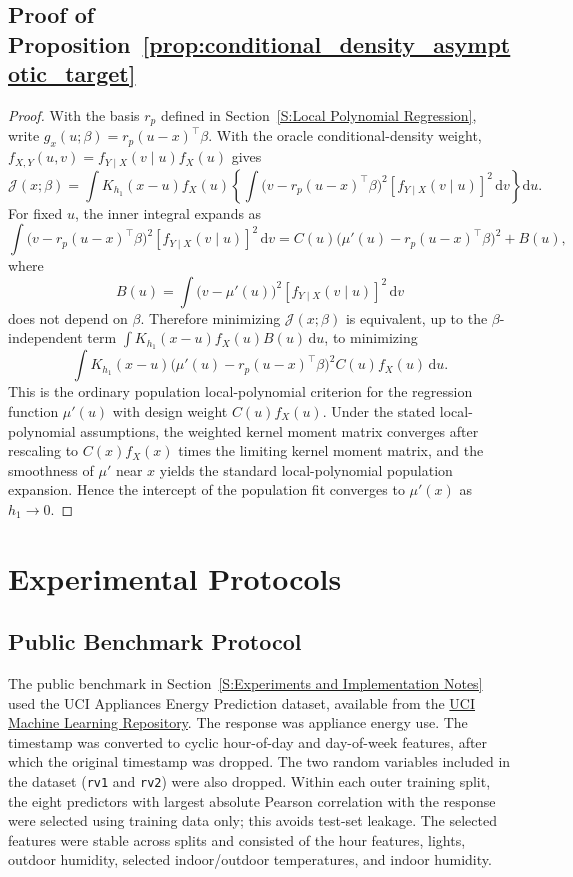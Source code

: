 \documentclass[preprint,1p,times,authoryear]{elsarticle}
\begin{document}
\subsection{Proof of Proposition~\ref{prop:conditional_density_asymptotic_target}}
\label{appendix:proof_conditional_density_asymptotic_target}
\begin{proof}
With the basis \(r_p\) defined in Section~\ref{S:Local Polynomial Regression}, write \(g_x(u;\beta)=r_p(u-x)^\top\beta\). With the oracle conditional-density
weight, \(f_{X,Y}(u,v)=f_{Y\mid X}(v\mid u)f_X(u)\) gives
\[
\mathcal J(x;\beta)
=\int K_{h_1}(x-u)f_X(u)
\left\{\int
\bigl(v-r_p(u-x)^\top\beta\bigr)^2
[f_{Y\mid X}(v\mid u)]^2\,\mathrm d v\right\}\mathrm d u.
\]
For fixed \(u\), the inner integral expands as
\[
\int
\bigl(v-r_p(u-x)^\top\beta\bigr)^2
[f_{Y\mid X}(v\mid u)]^2\,\mathrm d v
=
C(u)\bigl(\mu'(u)-r_p(u-x)^\top\beta\bigr)^2
+B(u),
\]
where
\[
B(u)=
\int
\bigl(v-\mu'(u)\bigr)^2
[f_{Y\mid X}(v\mid u)]^2\,\mathrm d v
\]
does not depend on \(\beta\). Therefore minimizing \(\mathcal J(x;\beta)\)
is equivalent, up to the \(\beta\)-independent term
\(\int K_{h_1}(x-u)f_X(u)B(u)\,\mathrm d u\), to minimizing
\[
\int
K_{h_1}(x-u)
\bigl(\mu'(u)-r_p(u-x)^\top\beta\bigr)^2
C(u)f_X(u)\,\mathrm d u.
\]
This is the ordinary population local-polynomial criterion for the regression
function \(\mu'(u)\) with design weight \(C(u)f_X(u)\). Under the stated
local-polynomial assumptions, the weighted kernel moment matrix converges after
rescaling to \(C(x)f_X(x)\) times the limiting kernel moment matrix, and the
smoothness of \(\mu'\) near \(x\) yields the standard local-polynomial
population expansion. Hence the intercept of the population fit converges to
\(\mu'(x)\) as \(h_1\to0\).
\end{proof}

\section{Experimental Protocols}

\subsection{Public Benchmark Protocol}
\label{appendix:public_benchmark_protocol}
The public benchmark in Section~\ref{S:Experiments and Implementation Notes} used the UCI Appliances Energy Prediction dataset, available from the \href{https://archive.ics.uci.edu/dataset/374/appliances+energy+prediction}{UCI Machine Learning Repository}. The response was appliance energy use. The timestamp was converted to cyclic hour-of-day and day-of-week features, after which the original timestamp was dropped. The two random variables included in the dataset (\texttt{rv1} and \texttt{rv2}) were also dropped. Within each outer training split, the eight predictors with largest absolute Pearson correlation with the response were selected using training data only; this avoids test-set leakage. The selected features were stable across splits and consisted of the hour features, lights, outdoor humidity, selected indoor/outdoor temperatures, and indoor humidity.
\end{document}
